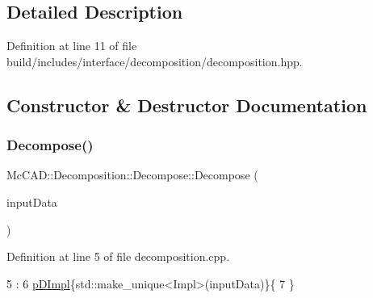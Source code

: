 \subsection{Detailed Description}


Definition at line 11 of file build/includes/interface/decomposition/decomposition.\+hpp.



\subsection{Constructor \& Destructor Documentation}
\mbox{\label{classMcCAD_1_1Decomposition_1_1Decompose_af2f1861cb1e63cc0523ef59a73f996f4}} 
\subsubsection{\texorpdfstring{Decompose()}{Decompose()}\hspace{0.1cm}{\footnotesize\ttfamily [1/2]}}
{\footnotesize\ttfamily Mc\+C\+A\+D\+::\+Decomposition\+::\+Decompose\+::\+Decompose (\begin{DoxyParamCaption}\item[{const \hyperlink{classMcCAD_1_1General_1_1InputData}{General\+::\+Input\+Data} \&}]{input\+Data }\end{DoxyParamCaption})}



Definition at line 5 of file decomposition.\+cpp.


\begin{DoxyCode}
5                                                                         :
6   \hyperlink{classMcCAD_1_1Decomposition_1_1Decompose_aa39ced95c033a2a77e4fe2c60ad8427c}{pDImpl}\{std::make\_unique<Impl>(inputData)\}\{
7 \}
\end{DoxyCode}
\mbox{\label{classMcCAD_1_1Decomposition_1_1Decompose_a044e46752ce3802e9484a58b82829162}} 
